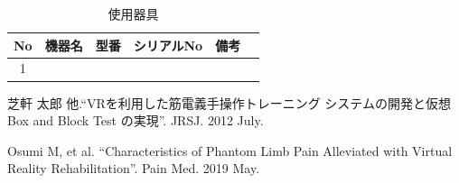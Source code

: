\documentclass{ltjsarticle}
\begin{document}
\begin{table}[H]
\begin{center}
\caption{使用器具}
\label{tab:used}
\begin{tabular}{clllll} \toprule
No&\multicolumn{1}{l}{機器名}&\multicolumn{1}{l}{型番}&\multicolumn{1}{l}{シリアルNo}&\multicolumn{1}{l}{備考}\\ \hline
1&&&&\\
\end{tabular}
\end{center}
\end{table}

\begin{thebibliography}{99}%
	\begin{spacing}{0.8}

	芝軒 太郎 他.``VRを利用した筋電義手操作トレーニング
	システムの開発と仮想 Box and Block Test の実現''. 
	JRSJ. 2012 July.

	Osumi M, et al.
	``Characteristics of Phantom Limb Pain Alleviated 
	with Virtual Reality Rehabilitation''. 
	Pain Med. 2019 May.

	\end{spacing}
\end{thebibliography}
\end{document}
